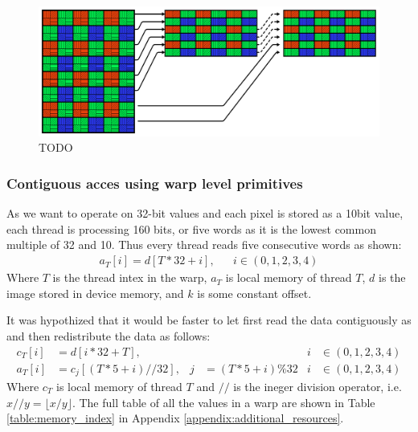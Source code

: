 \begin{figure}[H]
    \centering
    \includegraphics[width=\textwidth]{figures/polarized_image/read_line.pdf}
    \caption{TODO}
\end{figure}

\subsubsection{Contiguous acces using warp level primitives} \label{sec:contuguous_access}
As we want to operate on 32-bit values and each pixel is stored as a 10bit value, each thread is processing 160 bits, or five words as it is the lowest common multiple of 32 and 10.
Thus every thread reads five consecutive words as shown:
\begin{align}
    a_T[i] = d[T*32+i], &  & i \in (0,1,2,3,4)
\end{align}
Where $T$ is the thread intex in the warp, $a_T$ is local memory of thread $T$, $d$ is the image stored in device memory, and $k$ is some constant offset.

It was hypothized that it would be faster to let first read the data contiguously as and then redistribute the data as follows:
\begin{align}
    c_T[i] & = d[i*32+T],        &   &                 & i & \in (0,1,2,3,4) \\
    a_T[i] & = c_j[(T*5+i)//32], & j & = (T*5 + i)\%32 & i & \in (0,1,2,3,4)
    \label{eq:contiguous_reading}
\end{align}
Where $c_T$ is local memory of thread $T$ and $//$ is the ineger division operator, i.e. $x//y = \lfloor x/y \rfloor$.
The full table of all the values in a warp are shown in Table \ref{table:memory_index} in Appendix \ref{appendix:additional_resources}.

